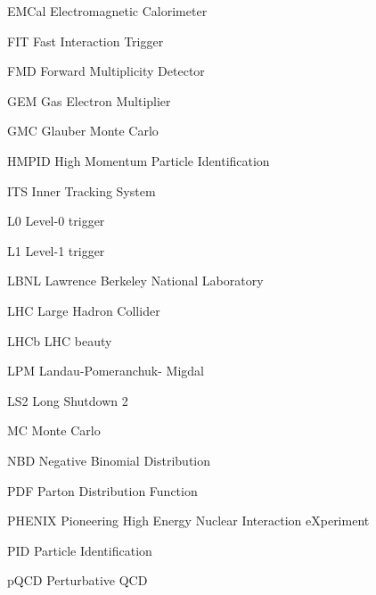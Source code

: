 \begin{abbrv}
\item[EMCal]			Electromagnetic Calorimeter

\item[FIT]				Fast Interaction Trigger
\item[FMD]			Forward Multiplicity Detector

\item[GEM]			Gas Electron Multiplier
\item[GMC]			Glauber Monte Carlo 

\item[HMPID]			High Momentum Particle Identification

\item[ITS]				Inner Tracking System


\item[L0]				Level-0 trigger
\item[L1]				Level-1 trigger

\item[LBNL]			Lawrence Berkeley National Laboratory
\item[LHC]			Large Hadron Collider
\item[LHCb]			LHC beauty
\item[LPM]			Landau-Pomeranchuk- Migdal
\item[LS2]				Long Shutdown 2

\item[MC]				Monte Carlo

\item[NBD]			Negative Binomial Distribution

\item[PDF]			Parton Distribution Function
\item[PHENIX]			Pioneering High Energy Nuclear Interaction eXperiment
\item[PID]				Particle Identification
\item[pQCD]			Perturbative QCD


\end{abbrv}
